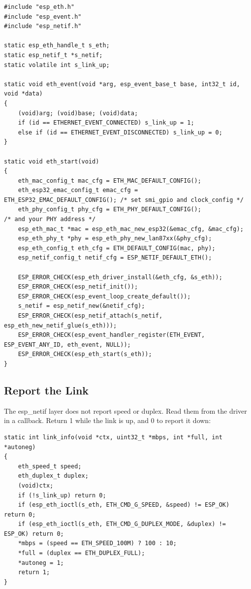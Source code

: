 \begin{lstlisting}
#include "esp_eth.h"
#include "esp_event.h"
#include "esp_netif.h"

static esp_eth_handle_t s_eth;
static esp_netif_t *s_netif;
static volatile int s_link_up;

static void eth_event(void *arg, esp_event_base_t base, int32_t id, void *data)
{
    (void)arg; (void)base; (void)data;
    if (id == ETHERNET_EVENT_CONNECTED) s_link_up = 1;
    else if (id == ETHERNET_EVENT_DISCONNECTED) s_link_up = 0;
}

static void eth_start(void)
{
    eth_mac_config_t mac_cfg = ETH_MAC_DEFAULT_CONFIG();
    eth_esp32_emac_config_t emac_cfg = ETH_ESP32_EMAC_DEFAULT_CONFIG(); /* set smi_gpio and clock_config */
    eth_phy_config_t phy_cfg = ETH_PHY_DEFAULT_CONFIG();                /* and your PHY address */
    esp_eth_mac_t *mac = esp_eth_mac_new_esp32(&emac_cfg, &mac_cfg);
    esp_eth_phy_t *phy = esp_eth_phy_new_lan87xx(&phy_cfg);
    esp_eth_config_t eth_cfg = ETH_DEFAULT_CONFIG(mac, phy);
    esp_netif_config_t netif_cfg = ESP_NETIF_DEFAULT_ETH();

    ESP_ERROR_CHECK(esp_eth_driver_install(&eth_cfg, &s_eth));
    ESP_ERROR_CHECK(esp_netif_init());
    ESP_ERROR_CHECK(esp_event_loop_create_default());
    s_netif = esp_netif_new(&netif_cfg);
    ESP_ERROR_CHECK(esp_netif_attach(s_netif, esp_eth_new_netif_glue(s_eth)));
    ESP_ERROR_CHECK(esp_event_handler_register(ETH_EVENT, ESP_EVENT_ANY_ID, eth_event, NULL));
    ESP_ERROR_CHECK(esp_eth_start(s_eth));
}
\end{lstlisting}

\subsection{Report the Link}

The esp\_netif layer does not report speed or duplex. Read them from the
driver in a  callback. Return 1 while the link is up, and 0 to
report it down:

\begin{lstlisting}
static int link_info(void *ctx, uint32_t *mbps, int *full, int *autoneg)
{
    eth_speed_t speed;
    eth_duplex_t duplex;
    (void)ctx;
    if (!s_link_up) return 0;
    if (esp_eth_ioctl(s_eth, ETH_CMD_G_SPEED, &speed) != ESP_OK) return 0;
    if (esp_eth_ioctl(s_eth, ETH_CMD_G_DUPLEX_MODE, &duplex) != ESP_OK) return 0;
    *mbps = (speed == ETH_SPEED_100M) ? 100 : 10;
    *full = (duplex == ETH_DUPLEX_FULL);
    *autoneg = 1;
    return 1;
}
\end{lstlisting}

